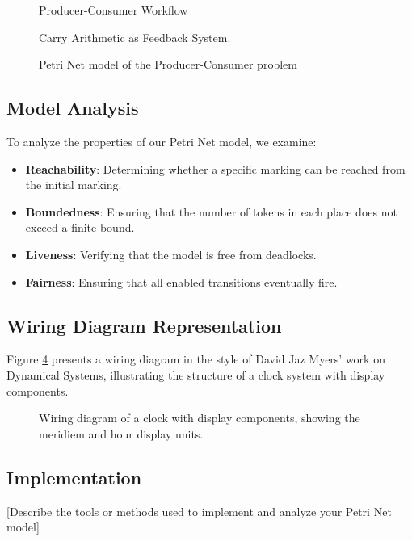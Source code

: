 \begin{figure}[htbp]

\caption{Producer-Consumer Workflow}
\label{fig:producer_consumer}
\end{figure}

\begin{figure}[htbp]
\centering

\caption{Carry Arithmetic as Feedback System.}
\label{fig:carry_arithmetic_feedback}
\end{figure}

\begin{figure}[htbp]
\centering

\caption{Petri Net model of the Producer-Consumer problem}
\label{fig:producer_consumer}
\end{figure}

\subsection{Model Analysis}

To analyze the properties of our Petri Net model, we examine:

\begin{itemize}
    \item \textbf{Reachability}: Determining whether a specific marking can be reached from the initial marking.
    \item \textbf{Boundedness}: Ensuring that the number of tokens in each place does not exceed a finite bound.
    \item \textbf{Liveness}: Verifying that the model is free from deadlocks.
    \item \textbf{Fairness}: Ensuring that all enabled transitions eventually fire.
\end{itemize}

\subsection{Wiring Diagram Representation}

Figure \ref{fig:clock_with_display} presents a wiring diagram in the style of David Jaz Myers' work on Dynamical Systems, illustrating the structure of a clock system with display components.

\begin{figure}[htbp]
\centering

\caption{Wiring diagram of a clock with display components, showing the meridiem and hour display units.}
\label{fig:clock_with_display}
\end{figure}

\subsection{Implementation}

[Describe the tools or methods used to implement and analyze your Petri Net model]